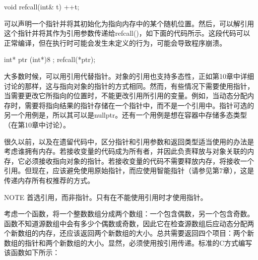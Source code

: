 \begin{cpp}
void refcall(int& t) { ++t; }
\end{cpp}

可以声明一个指针并将其初始化为指向内存中的某个随机位置。然后，可以解引用这个指针并将其作为引用参数传递给refcall()，如下面的代码所示。这段代码可以正常编译，但在执行时可能会发生未定义的行为，可能会导致程序崩溃。

\begin{cpp}
int* ptr { (int*)8 };
refcall(*ptr);
\end{cpp}

大多数时候，可以用引用代替指针。对象的引用也支持多态性，正如第10章中详细讨论的那样，这与指向对象的指针的方式相同。然而，有些情况下需要使用指针，当需要更改它所指向的位置时，不能更改引用所引用的变量。例如，当动态分配内存时，需要将指向结果的指针存储在一个指针中，而不是一个引用中。指针可选的另一个用例是，所以其可以是nullptr。还有一个用例是想在容器中存储多态类型（在第10章中讨论）。

很久以前，以及在遗留代码中，区分指针和引用参数和返回类型适当使用的办法是考虑谁拥有内存。若接收变量的代码成为所有者，并因此负责释放与对象关联的内存，它必须接收指向对象的指针。若接收变量的代码不需要释放内存，将接收一个引用。但现在，应该避免使用原始指针，而应使用智能指针（请参见第7章），这是传递内存所有权推荐的方式。

\begin{myNotic}{NOTE}
首选引用，而非指针。只有在不能使用引用时才使用指针。
\end{myNotic}

考虑一个函数，将一个整数数组分成两个数组：一个包含偶数，另一个包含奇数。函数不知道源数组中会有多少个偶数或奇数，因此它在检查源数组后应动态分配两个新数组的内存，还应该返回两个新数组的大小。总共需要返回四个项目：两个新数组的指针和两个新数组的大小。显然，必须使用按引用传递。标准的C方式编写该函数如下所示：


